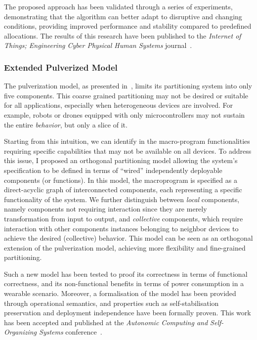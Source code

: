 \documentclass[runningheads]{llncs}
\begin{document}
The proposed approach has been validated through a series of experiments,
demonstrating that the algorithm can better adapt to disruptive and changing conditions,
providing improved performance and stability compared to predefined allocations.
%
The results of this research have been published to the \emph{Internet of Things; Engineering Cyber Physical Human Systems} journal~\cite{DBLP:journals/iot/FarabegoliPCV24}.

\subsubsection{Extended Pulverized Model}
The pulverization model,
as presented in~\cite{DBLP:journals/fi/CasadeiPPVW20},
limits its partitioning system into only five components.
%
This coarse grained partitioning may not be desired or suitable for all applications,
especially when heterogeneous devices are involved.
%
For example,
robots or drones equipped with only microcontrollers may not sustain the entire \emph{behavior},
but only a slice of it.

Starting from this intuition,
we can identify in the macro-program functionalities requiring specific capabilities that may not be available on all devices.
%
To address this issue,
I proposed an orthogonal partitioning model allowing the system's specification to be defined in terms of ``wired'' independently deployable components (or functions).
%
In this model,
the macroprogram is specified as a direct-acyclic graph of interconnected components,
each representing a specific functionality of the system.
%
We further distinguish between \emph{local} components,
namely components not requiring interaction since they are merely transformation from input to output,
and \emph{collective} components,
which require interaction with other components instances belonging to neighbor devices to achieve the desired (collective) behavior.
%
This model can be seen as an orthogonal extension of the pulverization model,
achieving more flexibility and fine-grained partitioning.

Such a new model has been tested to proof its correctness in terms of functional correctness,
and its non-functional benefits in terms of power consumption in a wearable scenario.
Moreover,
a formalisation of the model has been provided through operational semantics,
and properties such as self-stabilisation preservation and deployment independence have been formally proven.
%
This work has been accepted and published at the \emph{Autonomic Computing and Self-Organizing Systems} conference~\cite{DBLP:conf/acsos/FarabegoliVC24}.
\end{document}
